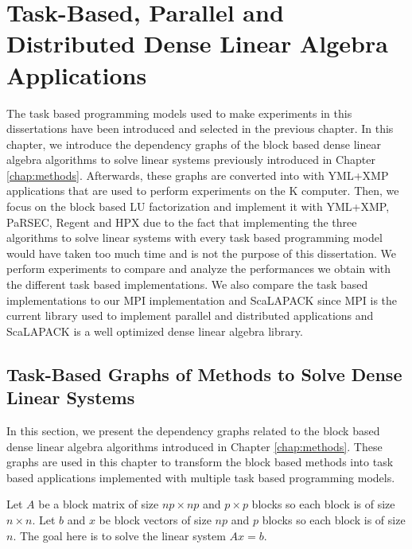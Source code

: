 \chapter{Task-Based, Parallel and Distributed Dense Linear Algebra Applications \label{chap:exp_dense}}
\graphicspath{{chapters/exp_dense/}}

The task based programming models used to make experiments in this dissertations have been introduced and selected in the previous chapter.
In this chapter, we introduce the dependency graphs of the block based dense linear algebra algorithms to solve linear systems previously introduced in Chapter \ref{chap:methods}.
Afterwards, these graphs are converted into with YML+XMP applications that are used to perform experiments on the K computer.
Then, we focus on the block based LU factorization and implement it with YML+XMP, PaRSEC, Regent and HPX due to the fact that implementing the three algorithms to solve linear systems with every task based programming model would have taken too much time and is not the purpose of this dissertation.
We perform experiments to compare and analyze the performances we obtain with the different task based implementations.
We also compare the task based implementations to our MPI implementation and ScaLAPACK since MPI is the current library used to implement parallel and distributed applications and ScaLAPACK is a well optimized dense linear algebra library.

\section{Task-Based Graphs of Methods to Solve Dense Linear Systems}
In this section, we present the dependency graphs related to the block based dense linear algebra algorithms introduced in Chapter \ref{chap:methods}.
These graphs are used in this chapter to transform the block based methods into task based applications implemented with multiple task based programming models.

Let $A$ be a block matrix of size $np \times np$ and $p \times p$ blocks so each block is of size $n \times n$.
Let $b$ and $x$ be block vectors of size $np$ and $p$ blocks so each block is of size $n$.
The goal here is to solve the linear system $Ax=b$.

